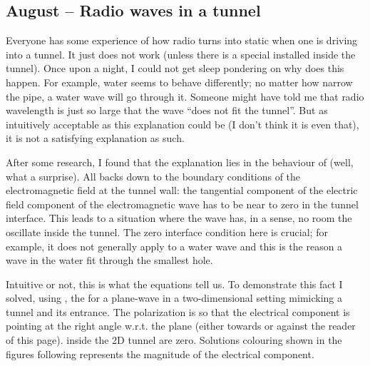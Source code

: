 \documentclass{article}
\begin{document}
\subsection{August – Radio waves in a tunnel}


Everyone has some experience of how radio turns into static when one is driving into a tunnel. It just does not work (unless there is a special   installed inside the tunnel).
Once upon a night, I could not get sleep pondering on why does this happen. For example, water seems to behave differently; no matter how narrow the pipe, a water wave will go through it. Someone might have told me that  radio wavelength is just so large that the wave “does not fit the tunnel”. But as intuitively acceptable as this explanation could be (I don't think it is even that), it is not a satisfying explanation as such.


After some research, I found that the explanation lies in the behaviour of  (well, what a surprise). All backs down to the boundary conditions of the electromagnetic field at the tunnel wall: the tangential component of the electric field component of the electromagnetic wave has to be near to zero in the tunnel interface. This leads to a situation where the wave has, in a sense, no room the oscillate inside the tunnel. The zero interface condition here is crucial; for example, it does not generally apply to a water wave and this is the reason a wave in the water fit through the smallest hole.


Intuitive or not, this is what the equations tell us. To demonstrate this fact I solved, using , the  for a plane-wave in a two-dimensional setting mimicking a tunnel and its entrance. The  polarization is so that the electrical component is pointing at the right angle w.r.t. the plane (either towards or against the reader of this page).  inside the 2D tunnel are zero. Solutions colouring shown in the figures following represents the magnitude of the electrical component.
\end{document}
